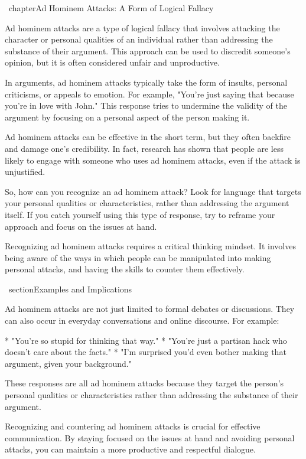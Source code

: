 \ chapter{Ad Hominem Attacks: A Form of Logical Fallacy}

 Ad hominem attacks are a type of logical fallacy that involves attacking the character or personal qualities of an individual rather than addressing the substance of their argument. This approach can be used to discredit someone's opinion, but it is often considered unfair and unproductive.

 In arguments, ad hominem attacks typically take the form of insults, personal criticisms, or appeals to emotion. For example, "You're just saying that because you're in love with John." This response tries to undermine the validity of the argument by focusing on a personal aspect of the person making it.

 Ad hominem attacks can be effective in the short term, but they often backfire and damage one's credibility. In fact, research has shown that people are less likely to engage with someone who uses ad hominem attacks, even if the attack is unjustified.

 So, how can you recognize an ad hominem attack? Look for language that targets your personal qualities or characteristics, rather than addressing the argument itself. If you catch yourself using this type of response, try to reframe your approach and focus on the issues at hand.

 Recognizing ad hominem attacks requires a critical thinking mindset. It involves being aware of the ways in which people can be manipulated into making personal attacks, and having the skills to counter them effectively.

\ section{Examples and Implications}

 Ad hominem attacks are not just limited to formal debates or discussions. They can also occur in everyday conversations and online discourse. For example:

*   "You're so stupid for thinking that way."
*   "You're just a partisan hack who doesn't care about the facts."
*   "I'm surprised you'd even bother making that argument, given your background."

 These responses are all ad hominem attacks because they target the person's personal qualities or characteristics rather than addressing the substance of their argument.

 Recognizing and countering ad hominem attacks is crucial for effective communication. By staying focused on the issues at hand and avoiding personal attacks, you can maintain a more productive and respectful dialogue.

